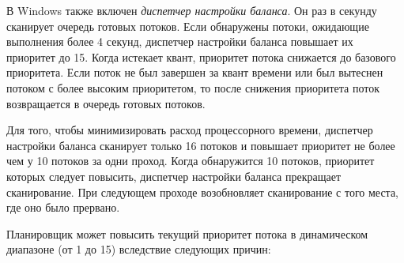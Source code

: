 В Windows также включен \textit{диспетчер настройки баланса}. Он раз в секунду сканирует очередь готовых потоков. Если обнаружены потоки, ожидающие выполнения более 4 секунд, диспетчер настройки баланса повышает их приоритет до 15. Когда истекает квант, приоритет потока снижается до базового приоритета. Если поток не был завершен за квант времени или был вытеснен потоком с более высоким приоритетом, то после снижения приоритета поток возвращается в очередь готовых потоков.

Для того, чтобы минимизировать расход процессорного времени, диспетчер настройки баланса сканирует только 16 потоков и повышает приоритет не более чем у 10 потоков за одни проход. Когда обнаружится 10 потоков, приоритет которых следует повысить, диспетчер настройки баланса прекращает сканирование. При следующем проходе возобновляет сканирование с того места, где оно было прервано.

Планировщик может повысить текущий приоритет потока в динамическом диапазоне (от 1 до 15) вследствие следующих причин:

